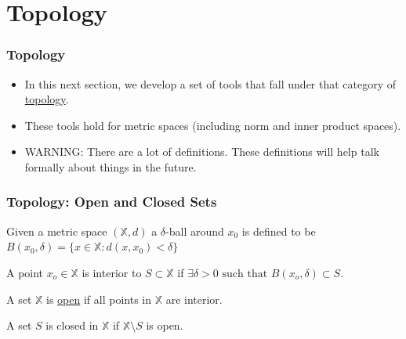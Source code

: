 \documentclass{beamer}
\begin{document}
\section{Topology}
\frame{\sectionpage}

\begin{frame}\frametitle{Topology}

\begin{itemize}
\item In this next section, we develop a set of tools that fall under that category of \underline{topology}.  
\item These tools hold for metric spaces (including norm and inner product spaces).
\item WARNING:  There are a lot of definitions.  These definitions will help talk formally about things in the future.
\end{itemize}
\end{frame}

\begin{frame}\frametitle{Topology: Open and Closed Sets}

\begin{definition}[Ball] Given a metric space $(\mathbb{X},d)$ a $\delta$-ball around $x_0$ is defined to be
\(
B(x_0,\delta) = \{ x \in \mathbb{X} : d(x,x_0) < \delta \}
\)
\end{definition}
\begin{definition}
 A point $x_o \in \mathbb{X}$ is interior to $S \subset \mathbb{X}$ if 
\(
\exists \delta > 0 \text{ such that } B(x_o,\delta) \subset S.
\)
\end{definition}
\begin{definition} A set $\mathbb{X}$ is \underline{open} if all points in $\mathbb{X}$ are interior.	
\end{definition}

\begin{definition} A set $S$ is closed in $\mathbb{X}$ if $\mathbb{X}\setminus S$ is open.	
\end{definition}

\end{frame}
\end{document}
